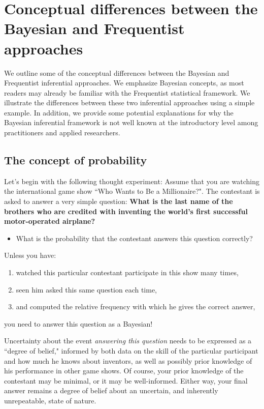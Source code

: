 \chapter{Conceptual differences between the Bayesian and Frequentist approaches}\label{chap2}

We outline some of the conceptual differences between the Bayesian and Frequentist inferential approaches. We emphasize Bayesian concepts, as most readers may already be familiar with the Frequentist statistical framework. We illustrate the differences between these two inferential approaches using a simple example. In addition, we provide some potential explanations for why the Bayesian inferential framework is not well known at the introductory level among practitioners and applied researchers.

\section{The concept of probability}\label{sec21}

Let's begin with the following thought experiment: Assume that you are watching the international game show ``Who Wants to Be a Millionaire?". The contestant is asked to answer a very simple question: \textbf{What is the last name of the brothers who are credited with inventing the world's first successful motor-operated airplane?}

\begin{itemize}
	\item What is the probability that the contestant answers this question correctly? 
\end{itemize}

Unless you have: 

\begin{enumerate}
	\item watched this particular contestant participate in this show many times,
	\item seen him asked this same question each time, 
	\item and computed the relative frequency with which he gives the correct answer,   
\end{enumerate}

you need to answer this question as a Bayesian!

Uncertainty about the event \textit{answering this question} needs to be expressed as a ``degree of belief," informed by both data on the skill of the particular participant and how much he knows about inventors, as well as possibly prior knowledge of his performance in other game shows. Of course, your prior knowledge of the contestant may be minimal, or it may be well-informed. Either way, your final answer remains a degree of belief about an uncertain, and inherently unrepeatable, state of nature.

